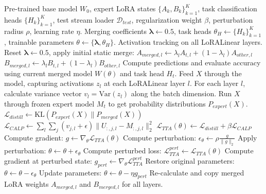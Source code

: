 \documentclass{article}
\begin{document}
\begin{algorithm}[t!]
\caption{CAS-Merge: Covariance-Aligned Sharpness-Aware Test-Time Low-Rank Model Merging}
\label{alg:cas_merge}
\begin{algorithmic}[1]
 Pre-trained base model $W_0$, expert LoRA states $\{A_k, B_k\}_{k=1}^K$, task classification heads $\{H_k\}_{k=1}^K$, test stream loader $\mathcal{D}_{test}$, regularization weight $\beta$, perturbation radius $\rho$, learning rate $\eta$.
 Merging coefficients $\boldsymbol{\lambda} \leftarrow \mathbf{0.5}$, task heads $\theta_H \leftarrow \{H_k\}_{k=1}^K$, trainable parameters $\theta \leftarrow \{\boldsymbol{\lambda}, \theta_H\}$.
 Activation tracking on all LoRALinear layers.
    \STATE Reset $\boldsymbol{\lambda} \leftarrow \mathbf{0.5}$, apply initial static merge:
        \STATE $A_{merged, l} \leftarrow \lambda_l A_{t, l} + (1 - \lambda_l) A_{other, l}$
        \STATE $B_{merged, l} \leftarrow \lambda_l B_{t, l} + (1 - \lambda_l) B_{other, l}$
    \ENDFOR
         Compute predictions and evaluate accuracy using current merged model $W(\theta)$ and task head $H_t$.
         Feed $X$ through the model, capturing activations $z_l$ at each LoRALinear layer $l$.
         For each layer $l$, calculate variance vector $v_l = \text{Var}(z_l)$ along the batch dimension.
         Run $X$ through frozen expert model $M_t$ to get probability distributions $P_{expert}(X)$.
        \STATE $\mathcal{L}_{distill} \leftarrow \text{KL}(P_{expert}(X) \| P_{merged}(X))$
        \STATE $\mathcal{L}_{CALP} \leftarrow \sum_l \sum_j (v_{j, l} + \epsilon) \| U_{:, j, l} - M_{:, j, l} \|_2^2$
        \STATE $\mathcal{L}_{TTA}(\theta) \leftarrow \mathcal{L}_{distill} + \beta \mathcal{L}_{CALP}$
        \STATE Compute gradient: $g \leftarrow \nabla_{\theta} \mathcal{L}_{TTA}(\theta)$
        \STATE Compute perturbation: $\epsilon_{\theta} \leftarrow \rho \frac{g}{\| g \|_2}$
        \STATE Apply perturbation: $\theta \leftarrow \theta + \epsilon_{\theta}$
        \STATE Compute perturbed loss: $\mathcal{L}_{TTA}^{pert} \leftarrow \mathcal{L}_{TTA}(\theta)$
        \STATE Compute gradient at perturbed state: $g_{pert} \leftarrow \nabla_{\theta} \mathcal{L}_{TTA}^{pert}$
        \STATE Restore original parameters: $\theta \leftarrow \theta - \epsilon_{\theta}$
        \STATE Update parameters: $\theta \leftarrow \theta - \eta g_{pert}$
         Re-calculate and copy merged LoRA weights $A_{merged, l}$ and $B_{merged, l}$ for all layers.
    \ENDFOR
\ENDFOR
\end{algorithmic}
\end{algorithm}
\end{document}
